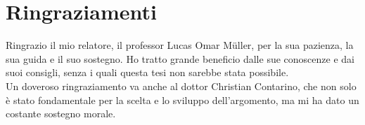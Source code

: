 
\chapter*{Ringraziamenti}
\thispagestyle{empty}

Ringrazio il mio relatore, il professor Lucas Omar Müller, per la sua pazienza, la sua guida e il suo sostegno. Ho tratto grande beneficio dalle sue conoscenze e dai suoi consigli, senza i quali questa tesi non sarebbe stata possibile.\\

Un doveroso ringraziamento va anche al dottor Christian Contarino, che non solo è stato fondamentale per la scelta e lo sviluppo dell'argomento, ma mi ha dato un costante sostegno morale.
\clearpage